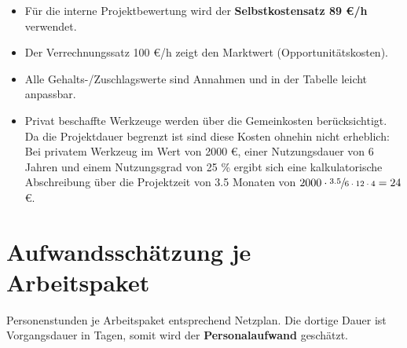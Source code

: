 \documentclass[
  a4paper,
  12pt,
  DIV=12,        %
  parskip=half,  %
  headings=small %
]{scrartcl}
\theoremstyle{definition}
\theoremstyle{definition}
\begin{document}
\begin{itemize}
\item Für die interne Projektbewertung wird der \textbf{Selbstkostensatz 89 \euro /h} verwendet. 
\item Der Verrechnungssatz 100 €/h zeigt den Marktwert (Opportunitätskosten).
\item Alle Gehalts-/Zuschlagswerte sind Annahmen und in der Tabelle leicht anpassbar.
\item Privat beschaffte Werkzeuge werden über die Gemeinkosten berücksichtigt. Da die Projektdauer begrenzt ist sind diese Kosten ohnehin nicht erheblich: Bei privatem Werkzeug im Wert von 2000 \euro, einer Nutzungsdauer von 6 Jahren und einem Nutzungsgrad von 25 \% ergibt sich eine kalkulatorische Abschreibung über die Projektzeit von 3.5 Monaten von $ 2000 \cdot \sfrac{3.5}{6\cdot 12\cdot4} = 24 $ \euro. 
\end{itemize}



\section{Aufwandsschätzung je Arbeitspaket}

Personenstunden je Arbeitspaket entsprechend Netzplan. Die dortige Dauer ist Vorgangsdauer in Tagen, somit wird der \textbf{Personalaufwand} geschätzt.
\end{document}

